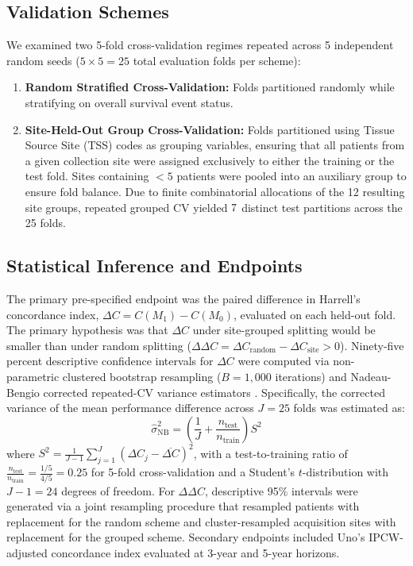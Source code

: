 \documentclass{article}
\begin{document}
\subsection{Validation Schemes}
We examined two 5-fold cross-validation regimes repeated across 5 independent random seeds ($5 \times 5 = 25$ total evaluation folds per scheme):
\begin{enumerate}
    \item \textbf{Random Stratified Cross-Validation:} Folds partitioned randomly while stratifying on overall survival event status.
    \item \textbf{Site-Held-Out Group Cross-Validation:} Folds partitioned using Tissue Source Site (TSS) codes as grouping variables, ensuring that all patients from a given collection site were assigned exclusively to either the training or the test fold. Sites containing $<5$ patients were pooled into an auxiliary group to ensure fold balance. Due to finite combinatorial allocations of the 12 resulting site groups, repeated grouped CV yielded $7$ distinct test partitions across the 25 folds.
\end{enumerate}

\subsection{Statistical Inference and Endpoints}
The primary pre-specified endpoint was the paired difference in Harrell's concordance index, $\Delta C = C(M_1) - C(M_0)$, evaluated on each held-out fold. The primary hypothesis was that $\Delta C$ under site-grouped splitting would be smaller than under random splitting ($\Delta\Delta C = \Delta C_{\text{random}} - \Delta C_{\text{site}} > 0$). Ninety-five percent descriptive confidence intervals for $\Delta C$ were computed via non-parametric clustered bootstrap resampling ($B = 1,000$ iterations) and Nadeau-Bengio corrected repeated-CV variance estimators \citep{nadeau2003inference}. Specifically, the corrected variance of the mean performance difference across $J = 25$ folds was estimated as:
\begin{equation}
\hat{\sigma}^2_{\text{NB}} = \left( \frac{1}{J} + \frac{n_{\text{test}}}{n_{\text{train}}} \right) S^2
\end{equation}
where $S^2 = \frac{1}{J-1} \sum_{j=1}^J (\Delta C_j - \overline{\Delta C})^2$, with a test-to-training ratio of $\frac{n_{\text{test}}}{n_{\text{train}}} = \frac{1/5}{4/5} = 0.25$ for 5-fold cross-validation and a Student's $t$-distribution with $J - 1 = 24$ degrees of freedom. For $\Delta\Delta C$, descriptive 95\% intervals were generated via a joint resampling procedure that resampled patients with replacement for the random scheme and cluster-resampled acquisition sites with replacement for the grouped scheme. Secondary endpoints included Uno's IPCW-adjusted concordance index evaluated at 3-year and 5-year horizons.
\end{document}
